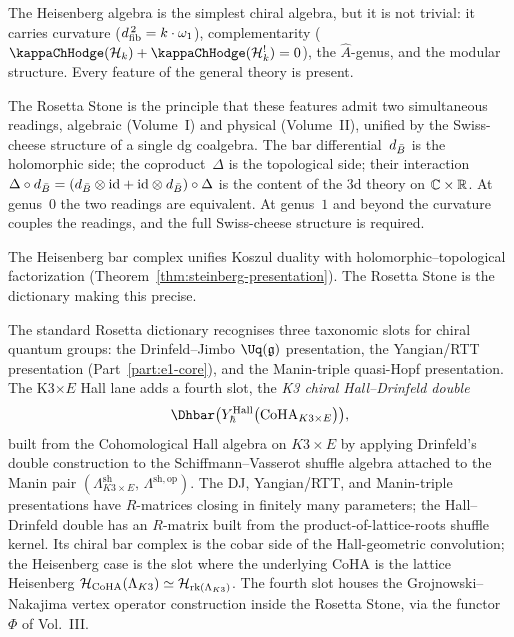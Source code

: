 \begin{remark}
\label{rem:rosetta-principle}
The Heisenberg algebra is the simplest chiral algebra, but it is not trivial: it carries curvature ($d_{\mathrm{fib}}^{\,2} = k \cdot \omega_1$), complementarity ($\kappaChHodge(\cH_k) + \kappaChHodge(\cH_k^!) = 0$), the $\hat{A}$-genus, and the modular structure. Every feature of the general theory is present.

The Rosetta Stone is the principle that these features admit two simultaneous readings, algebraic (Volume~I) and physical (Volume~II), unified by the Swiss-cheese structure of a single dg coalgebra. The bar differential~$d_{\bar{B}}$ is the holomorphic side; the coproduct~$\Delta$ is the topological side; their interaction $\Delta \circ d_{\bar{B}} = (d_{\bar{B}} \otimes \mathrm{id} + \mathrm{id} \otimes d_{\bar{B}}) \circ \Delta$ is the content of the 3d theory on $\mathbb{C} \times \mathbb{R}$. At genus~$0$ the two readings are equivalent. At genus~$1$ and beyond the curvature couples the readings, and the full Swiss-cheese structure is required.

The Heisenberg bar complex unifies Koszul duality with holomorphic--topological factorization (Theorem~\ref{thm:steinberg-presentation}). The Rosetta Stone is the dictionary making this precise.
\end{remark}

\begin{remark}
\label{rem:rosetta-hall-drinfeld-double}
%
%
The standard Rosetta dictionary recognises three taxonomic slots for chiral quantum groups: the Drinfeld--Jimbo $\Uq(\fg)$ presentation, the Yangian/RTT presentation (Part~\ref{part:e1-core}), and the Manin-triple quasi-Hopf presentation. The K3$\times E$ Hall lane adds a fourth slot, the \emph{K3 chiral Hall--Drinfeld double}
\[
\Dhbar\bigl(Y^{\mathrm{Hall}}_\hbar\bigl(\mathrm{CoHA}_{K3 \times E}\bigr)\bigr),
\]
built from the Cohomological Hall algebra on $K3 \times E$ by applying Drinfeld's double construction to the Schiffmann--Vasserot shuffle algebra attached to the Manin pair $(\Lambda_{K3 \times E}^{\mathrm{sh}},\,\Lambda^{\mathrm{sh,op}})$. The DJ, Yangian/RTT, and Manin-triple presentations have $R$-matrices closing in finitely many parameters; the Hall--Drinfeld double has an $R$-matrix built from the product-of-lattice-roots shuffle kernel. Its chiral bar complex is the cobar side of the Hall-geometric convolution; the Heisenberg case is the slot where the underlying CoHA is the lattice Heisenberg $\mathcal{H}_{\mathrm{CoHA}}(\Lambda_{K3}) \simeq \mathcal{H}_{\mathrm{rk}(\Lambda_{K3})}$. The fourth slot houses the Grojnowski--Nakajima vertex operator construction inside the Rosetta Stone, via the functor~$\Phi$ of Vol.~III.
\end{remark}

